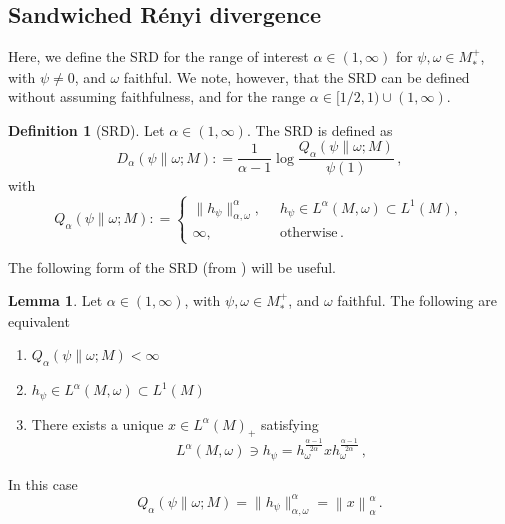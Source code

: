 \documentclass[11pt,a4paper]{article}
\theoremstyle{plain}
\numberwithin{theorem}{section}
\theoremstyle{definition}
\newtheorem{definition}[theorem]{Definition}
\newtheorem{lemma}[theorem]{Lemma}
\newcommand{\?}{\overset{?}{=}}
\newcommand{\defeq}{\mathrel{\mathop:}=}
\newcommand{\I}{\infty}
\renewcommand{\a}{\alpha}	%
\begin{document}
\subsection{Sandwiched R\'{e}nyi divergence}\label{ssec:srd}
Here, we define the SRD for the range of interest $\a\in (1,\I)$ for $\psi,\omega\in M_*^+$, with $\psi\neq0$, and $\omega$ faithful. We note, however, that the SRD can be defined without assuming faithfulness, and for the range $\alpha \in [1/2,1)\cup(1,\I)$.
\begin{definition}[SRD]\label{def:SRD}
Let $\alpha \in (1,\I)$. The SRD is defined as \cite{Jencova:2016tqz,Jencova:2017txf}
\begin{equation}
    D_\alpha(\psi\|\omega;M)\defeq\frac{1}{\alpha-1}\log\frac{Q_\alpha(\psi\|\omega;M)}{\psi(1)}\,,
\end{equation}
with
\begin{equation}\label{eq:QSRD}
 Q_\alpha(\psi\|\omega;M)\defeq
    \begin{cases}
        \|h_\psi\|_{\alpha,\omega}^\alpha, & h_\psi \in L^\alpha(M,\omega)\subset L^1(M),\\[1em]
        \I, \qquad \qquad &\text{otherwise}\,.
    \end{cases}
\end{equation}
\end{definition}

The following form of the SRD (from \cite[Lemma 8]{Kato:2023aro}) will be useful.
\begin{lemma}           \label{lem:y-op-defn-SRD}
Let $\alpha\in (1,\I)$, with $\psi,\omega \in M_*^+$, and $\omega$ faithful. The following are equivalent
\begin{enumerate}
    \item $Q_\a(\psi\|\omega;M)<\I$
    \item $h_\psi\in L^\alpha(M,\omega)\subset L^1(M)$
    \item There exists a unique $x\in L^\a(M)_+$ satisfying
    \begin{equation}			\label{eq:x-op-defn-SRD}
	L^\alpha(M,\omega)\ni h_\psi = h_\omega^{\frac{\a-1}{2\a}} x h_\omega^{\frac{\a-1}{2\a}}\,,
\end{equation} 
\end{enumerate}
In this case
 \begin{equation}
     Q_\a(\psi\|\omega;M)=\|h_\psi\|_{\alpha,\omega}^\alpha=\left\|x\right\|_\a^\a\,.
 \end{equation}
\end{lemma}
\end{document}
